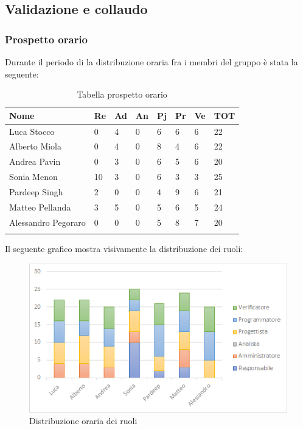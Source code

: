 \subsection{Validazione e collaudo}
\subsubsection{Prospetto orario}
Durante il periodo di  la distribuzione oraria fra i membri del gruppo è stata la seguente:
\begin{center}
	\renewcommand{\arraystretch}{1.5}
	\begin{longtable}[H]{ p{3.5cm}  p{1.2cm} p{1.2cm}  p{1.2cm} p{1.2cm}  p{1.2cm} p{1.2cm}  p{1.4cm}  }
		\rowcolor{tableHeadYellow}
		\textbf{Nome}   & \textbf{Re} & \textbf{Ad} & \textbf{An} & \textbf{Pj} & \textbf{Pr} & \textbf{Ve} & \textbf{TOT} \\ 
		\endhead
		Luca Stocco       & 0   & 4     & 0   & 6    & 6    & 6   	& 22 \\  
		Alberto Miola     & 0   & 4     & 0   & 8    & 4    & 6   	& 22 \\  
		Andrea Pavin      & 0   & 3     & 0   & 6    & 5    & 6   	& 20 \\  
		Sonia Menon       & 10  & 3     & 0   & 6    & 3    & 3   	& 25 \\  
		Pardeep Singh     & 2   & 0     & 0   & 4    & 9    & 6   	& 21 \\  
		Matteo Pellanda   & 3   & 5     & 0   & 5    & 6    & 5   	& 24 \\ 
		Alessandro Pegoraro & 0 & 0		& 0	  & 5	 & 8 	& 7 	& 20 \\  
		\rowcolor{white}
		\caption{Tabella prospetto orario}
	\end{longtable}
\end{center}
Il seguente grafico mostra visivamente la distribuzione dei ruoli:
\begin{figure}[H]
	\centering
	\includegraphics[width=15cm,keepaspectratio]{../includes/pics/grafici/grafico9.png}
	\caption{\label{fig:mission}Distribuzione oraria dei ruoli}
\end{figure}
\clearpage
